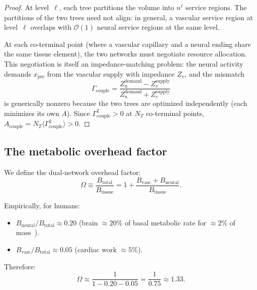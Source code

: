 \documentclass[aps,pre,twocolumn,superscriptaddress,longbibliography]{revtex4-2}
\newcommand{\Acouple}{A_{\text{couple}}}
\begin{document}
\begin{proof}
At level~$\ell$, each tree partitions the volume into
$n^\ell$ service regions.
The partitions of the two trees need not align:
in general, a vascular service region at level~$\ell$
overlaps with $\mathcal{O}(1)$ neural service regions
at the same level.

At each co-terminal point (where a vascular capillary
and a neural ending share the same tissue element),
the two networks must negotiate resource allocation.
This negotiation is itself an impedance-matching problem:
the neural activity demands $x_{\text{pre}}$ from the
vascular supply with impedance $Z_v$, and the mismatch
\begin{equation}
  \Gamma_{\text{couple}} =
    \frac{Z_n^{\text{demand}} - Z_v^{\text{supply}}}
         {Z_n^{\text{demand}} + Z_v^{\text{supply}}}
  \label{eq:gamma-couple}
\end{equation}
is generically nonzero because the two trees are
optimized independently (each minimizes its own $A$).
Since $\Gamma_{\text{couple}}^2 > 0$ at $N_T$ co-terminal
points, $\Acouple = N_T \langle \Gamma_{\text{couple}}^2
\rangle > 0$.
\end{proof}


\subsection{The metabolic overhead factor}

We define the dual-network overhead factor:
\begin{equation}
  \Omega \equiv \frac{B_{\text{total}}}{B_{\text{tissue}}}
  = 1 + \frac{B_{\text{vasc}} + B_{\text{neural}}}
             {B_{\text{tissue}}}.
  \label{eq:omega-def}
\end{equation}

Empirically, for humans:
\begin{itemize}
  \item $B_{\text{neural}} / B_{\text{total}} \approx 0.20$
    (brain $\approx 20\%$ of basal metabolic rate for
    $\approx 2\%$ of mass~\cite{Raichle2002}).
  \item $B_{\text{vasc}} / B_{\text{total}} \approx 0.05$
    (cardiac work $\approx 5\%$).
\end{itemize}

Therefore:
\begin{equation}
  \Omega \approx \frac{1}{1 - 0.20 - 0.05} = \frac{1}{0.75}
  \approx 1.33.
  \label{eq:omega-human}
\end{equation}
\end{document}
